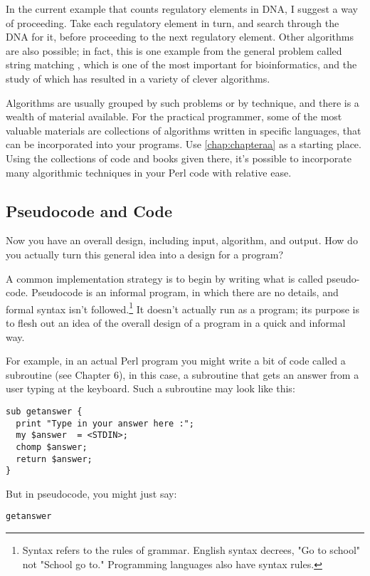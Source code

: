 In the current example that counts regulatory elements in DNA, I suggest a way of proceeding. Take each regulatory element in turn, and search through the DNA for it, before proceeding to the next regulatory element. Other algorithms are also possible; in fact, this is one example from the general problem called string matching , which is one of the most important for bioinformatics, and the study of which has resulted in a variety of clever algorithms.

Algorithms are usually grouped by such problems or by technique, and there is a wealth of material available. For the practical programmer, some of the most valuable materials are collections of algorithms written in specific languages, that can be incorporated into your programs. Use \ref{chap:chapteraa} as a starting place. Using the collections of code and books given there, it's possible to incorporate many algorithmic techniques in your Perl code with relative ease. 

\subsection{Pseudocode and Code}
Now you have an overall design, including input, algorithm, and output.  How do you actually turn this general idea into a design for a program?

A common implementation strategy is to begin by writing what is called pseudo-code. Pseudocode is an informal program, in which there are no details, and formal syntax isn't followed.\footnote{Syntax refers to the rules of grammar. English syntax decrees, "Go to school" not "School go to." Programming languages also have syntax rules.} It doesn't actually run as a program; its purpose is to flesh out an idea of the overall design of a program in a quick and informal way.

For example, in an actual Perl program you might write a bit of code called a subroutine (see Chapter 6), in this case, a subroutine that gets an answer from a user typing at the keyboard. Such a subroutine may look like this: 

\begin{lstlisting}
sub getanswer {
  print "Type in your answer here :";
  my $answer  = <STDIN>;
  chomp $answer;
  return $answer;
}
\end{lstlisting}

But in pseudocode, you might just say:

\begin{lstlisting}
getanswer
\end{lstlisting}


